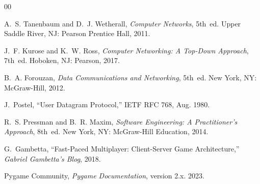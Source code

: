 \documentclass[conference]{IEEEtran}
\begin{document}
\begin{thebibliography}{00}

A.~S. Tanenbaum and D.~J. Wetherall,
\textit{Computer Networks}, 5th~ed.
Upper Saddle River, NJ: Pearson Prentice Hall, 2011.

J.~F. Kurose and K.~W. Ross,
\textit{Computer Networking: A Top-Down Approach}, 7th~ed.
Hoboken, NJ: Pearson, 2017.

B.~A. Forouzan,
\textit{Data Communications and Networking}, 5th~ed.
New York, NY: McGraw-Hill, 2012.

J.~Postel,
``User Datagram Protocol,''
IETF RFC 768, Aug. 1980.

R.~S. Pressman and B.~R. Maxim,
\textit{Software Engineering: A Practitioner's Approach}, 8th~ed.
New York, NY: McGraw-Hill Education, 2014.

G.~Gambetta,
``Fast-Paced Multiplayer: Client-Server Game Architecture,''
\textit{Gabriel Gambetta's Blog}, 2018.

Pygame Community,
\textit{Pygame Documentation}, version 2.x.
2023.

\end{thebibliography}
\end{document}
